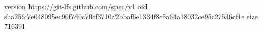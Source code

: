 version https://git-lfs.github.com/spec/v1
oid sha256:7e048095ec90f7d0c70cf3710a2bbaf6e1334f8c5a64a18032ce95c27536cf1e
size 716391
